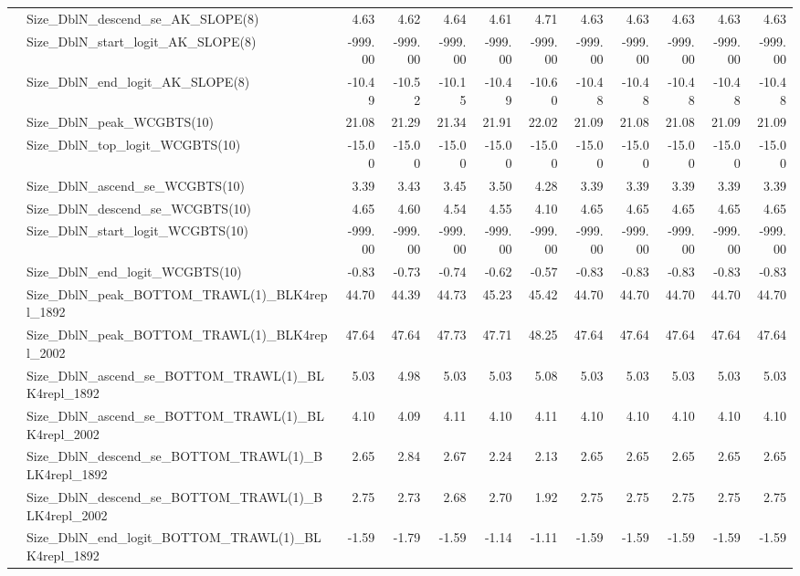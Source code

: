 \documentclass[
]{scrartcl}
\begin{document}
\begin{landscape}
\begin{longtable}{llrrrrrrrrrr}
 & Size\_DblN\_descend\_se\_AK\_SLOPE(8) & 4.63 & 4.62 & 4.64 & 4.61 & 4.71 & 4.63 & 4.63 & 4.63 & 4.63 & 4.63 \\ 
 & Size\_DblN\_start\_logit\_AK\_SLOPE(8) & -999.00 & -999.00 & -999.00 & -999.00 & -999.00 & -999.00 & -999.00 & -999.00 & -999.00 & -999.00 \\ 
 & Size\_DblN\_end\_logit\_AK\_SLOPE(8) & -10.49 & -10.52 & -10.15 & -10.49 & -10.60 & -10.48 & -10.48 & -10.48 & -10.48 & -10.48 \\ 
 & Size\_DblN\_peak\_WCGBTS(10) & 21.08 & 21.29 & 21.34 & 21.91 & 22.02 & 21.09 & 21.08 & 21.08 & 21.09 & 21.09 \\ 
 & Size\_DblN\_top\_logit\_WCGBTS(10) & -15.00 & -15.00 & -15.00 & -15.00 & -15.00 & -15.00 & -15.00 & -15.00 & -15.00 & -15.00 \\ 
 & Size\_DblN\_ascend\_se\_WCGBTS(10) & 3.39 & 3.43 & 3.45 & 3.50 & 4.28 & 3.39 & 3.39 & 3.39 & 3.39 & 3.39 \\ 
 & Size\_DblN\_descend\_se\_WCGBTS(10) & 4.65 & 4.60 & 4.54 & 4.55 & 4.10 & 4.65 & 4.65 & 4.65 & 4.65 & 4.65 \\ 
 & Size\_DblN\_start\_logit\_WCGBTS(10) & -999.00 & -999.00 & -999.00 & -999.00 & -999.00 & -999.00 & -999.00 & -999.00 & -999.00 & -999.00 \\ 
 & Size\_DblN\_end\_logit\_WCGBTS(10) & -0.83 & -0.73 & -0.74 & -0.62 & -0.57 & -0.83 & -0.83 & -0.83 & -0.83 & -0.83 \\ 
 & Size\_DblN\_peak\_BOTTOM\_TRAWL(1)\_BLK4repl\_1892 & 44.70 & 44.39 & 44.73 & 45.23 & 45.42 & 44.70 & 44.70 & 44.70 & 44.70 & 44.70 \\ 
 & Size\_DblN\_peak\_BOTTOM\_TRAWL(1)\_BLK4repl\_2002 & 47.64 & 47.64 & 47.73 & 47.71 & 48.25 & 47.64 & 47.64 & 47.64 & 47.64 & 47.64 \\ 
 & Size\_DblN\_ascend\_se\_BOTTOM\_TRAWL(1)\_BLK4repl\_1892 & 5.03 & 4.98 & 5.03 & 5.03 & 5.08 & 5.03 & 5.03 & 5.03 & 5.03 & 5.03 \\ 
 & Size\_DblN\_ascend\_se\_BOTTOM\_TRAWL(1)\_BLK4repl\_2002 & 4.10 & 4.09 & 4.11 & 4.10 & 4.11 & 4.10 & 4.10 & 4.10 & 4.10 & 4.10 \\ 
 & Size\_DblN\_descend\_se\_BOTTOM\_TRAWL(1)\_BLK4repl\_1892 & 2.65 & 2.84 & 2.67 & 2.24 & 2.13 & 2.65 & 2.65 & 2.65 & 2.65 & 2.65 \\ 
 & Size\_DblN\_descend\_se\_BOTTOM\_TRAWL(1)\_BLK4repl\_2002 & 2.75 & 2.73 & 2.68 & 2.70 & 1.92 & 2.75 & 2.75 & 2.75 & 2.75 & 2.75 \\ 
 & Size\_DblN\_end\_logit\_BOTTOM\_TRAWL(1)\_BLK4repl\_1892 & -1.59 & -1.79 & -1.59 & -1.14 & -1.11 & -1.59 & -1.59 & -1.59 & -1.59 & -1.59 \\ 

\end{longtable}
\end{landscape}
\end{document}
